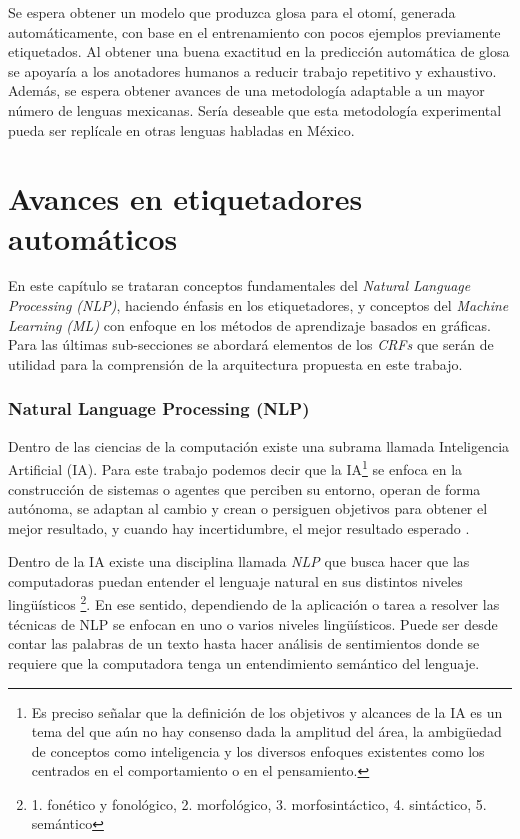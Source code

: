 \documentclass[letterpaper,12pt,oneside]{book}
\newcommand{\note}[4][]{\todo[author=#2,color=#3,size=\scriptsize,fancyline,caption={},#1]{#4}} %
\newcommand{\diego}[2][]{\note[#1]{Diego}{blue!40}{#2}}
\theoremstyle{definition}
\begin{document}
Se espera obtener un modelo que produzca glosa para el otomí, generada automáticamente, con base en el entrenamiento con pocos ejemplos previamente etiquetados. Al obtener una buena exactitud en la predicción automática de glosa se apoyaría a los anotadores humanos a reducir trabajo repetitivo y exhaustivo. Además, se espera obtener avances de una metodología adaptable a un mayor número de lenguas mexicanas. Sería deseable que esta metodología experimental pueda ser replícale en otras lenguas habladas en México.

\chapter{Avances en etiquetadores automáticos}\label{sec:marco}


En este capítulo se trataran conceptos fundamentales del \textit{Natural Language Processing (NLP)}, haciendo énfasis en los etiquetadores, y conceptos del \textit{ Machine Learning (ML)} con enfoque en los métodos de aprendizaje basados en gráficas. Para las últimas sub-secciones se abordará elementos de los \textit{CRFs} que serán de utilidad para la comprensión de la arquitectura propuesta en este trabajo.



\subsection{Natural Language Processing (NLP)}

Dentro de las ciencias de la computación existe una subrama llamada Inteligencia Artificial (IA). Para este trabajo podemos decir que la IA\footnote{Es preciso señalar que la definición de los objetivos y alcances de la IA es un tema del que aún no hay consenso dada la amplitud del área, la ambigüedad de conceptos como inteligencia y los diversos enfoques existentes como los centrados en el comportamiento o en el pensamiento.} se enfoca en la construcción de sistemas o agentes que perciben su entorno, operan de forma autónoma, se adaptan al cambio y crean o persiguen objetivos para obtener el mejor resultado, y cuando hay incertidumbre, el mejor resultado esperado \citep{russell2010artificial}.

Dentro de la IA existe una disciplina llamada \textit{NLP} que busca hacer que las computadoras puedan entender el lenguaje natural en sus distintos niveles lingüísticos \diego{CITAR a VIC} \footnote{1. fonético y fonológico, 2. morfológico, 3. morfosintáctico, 4. sintáctico, 5. semántico}. En ese sentido, dependiendo de la aplicación o tarea a resolver las técnicas de NLP se enfocan en uno o varios niveles lingüísticos. Puede ser desde contar las palabras de un texto hasta hacer análisis de sentimientos donde se requiere que la computadora tenga un entendimiento semántico del lenguaje.
\end{document}
